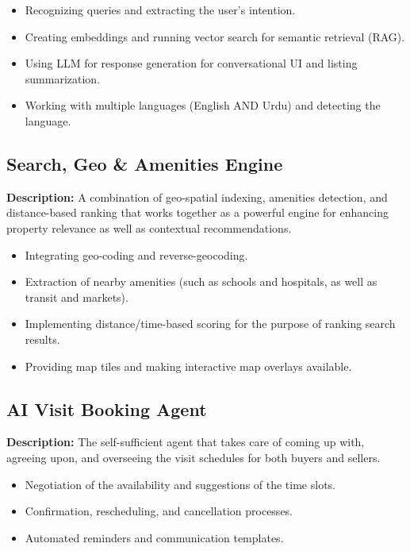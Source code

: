\begin{itemize}
    \item Recognizing queries and extracting the user's intention.
    \item Creating embeddings and running vector search for semantic retrieval (RAG).
    \item Using LLM for response generation for conversational UI and listing summarization.
    \item Working with multiple languages (English AND Urdu) and detecting the language.
\end{itemize}

\subsection{Search, Geo \& Amenities Engine}

\textbf{Description:} A combination of geo-spatial indexing, amenities detection, and distance-based ranking that works together as a powerful engine for enhancing property relevance as well as contextual recommendations.

\begin{itemize}
    \item Integrating geo-coding and reverse-geocoding.
    \item Extraction of nearby amenities (such as schools and hospitals, as well as transit and markets).
    \item Implementing distance/time-based scoring for the purpose of ranking search results.
    \item Providing map tiles and making interactive map overlays available.
\end{itemize}

\subsection{AI Visit Booking Agent}

\textbf{Description:} The self-sufficient agent that takes care of coming up with, agreeing upon, and overseeing the visit schedules for both buyers and sellers.

\begin{itemize}
    \item Negotiation of the availability and suggestions of the time slots.
    \item Confirmation, rescheduling, and cancellation processes.
    \item Automated reminders and communication templates.
\end{itemize}

